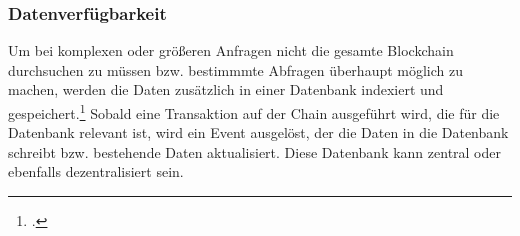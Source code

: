 \subsubsection{Datenverfügbarkeit}
\label{sec:Datenverfügbarkeit}
Um bei komplexen oder größeren Anfragen nicht die gesamte Blockchain durchsuchen zu müssen bzw. bestimmmte Abfragen überhaupt möglich zu machen, werden die Daten zusätzlich in einer Datenbank indexiert und gespeichert.\footcites[Vgl. hierzu und im Folgenden][]{w32}[]{w33}
Sobald eine Transaktion auf der Chain ausgeführt wird, die für die Datenbank relevant ist, wird ein Event ausgelöst, der die Daten in die Datenbank schreibt bzw. bestehende Daten aktualisiert.
Diese Datenbank kann zentral oder ebenfalls dezentralisiert sein.